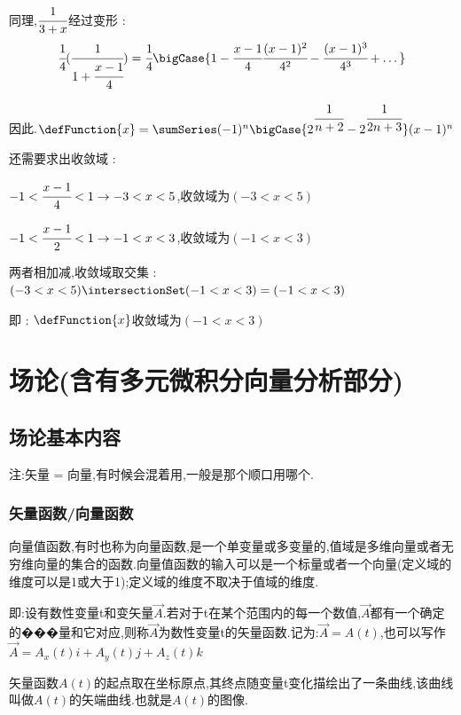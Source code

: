 {{{{{\begin{enumerate}
{          同理,$\cfrac{1}{3 + x}$经过变形 :
          $$
            \cfrac{1}{4}(\cfrac{1}{1 + \cfrac{x - 1}{4}}) = \cfrac{1}{4}\bigCase{1 - \cfrac{x - 1}{4} \cfrac{(x - 1)^2}{4^2} - \cfrac{(x - 1)^3}{4^3} + \dots}
          $$

          因此.$\defFunction{x} = \sumSeries(-1)^n\bigCase{2^{\cfrac{1}{n + 2}} - 2^{\cfrac{1}{2n + 3}}}(x - 1)^n$

          还需要求出收敛域 :

          $-1 < \cfrac{x - 1}{4} < 1 \to -3 < x < 5$,收敛域为$(-3 < x < 5)$

          $-1 < \cfrac{x - 1}{2} < 1 \to -1 < x < 3$,收敛域为$(-1 < x < 3)$

          两者相加减,收敛域取交集 : $(-3 < x < 5) \intersectionSet (-1 < x < 3) = (-1 < x < 3)$

          即 : $\defFunction{x}$收敛域为$(-1 < x < 3)$
          }
  \end{enumerate}
}%

}%

}%

}%

\chapter{场论(含有多元微积分向量分析部分)}{

  \section{场论基本内容}{
    注:矢量 = 向量,有时候会混着用,一般是那个顺口用哪个.

    \subsection{矢量函数/向量函数}{
      向量值函数,有时也称为向量函数,是一个单变量或多变量的,值域是多维向量或者无穷维向量的集合的函数.向量值函数的输入可以是一个标量或者一个向量(定义域的维度可以是1或大于1);定义域的维度不取决于值域的维度.

      即:设有数性变量t和变矢量$\vec{A}$.若对于t在某个范围内的每一个数值,$\vec{A}$都有一个确定的���量和它对应,则称$\vec{A}$为数性变量t的矢量函数.记为:$\vec{A} = A(t)$,也可以写作$\vec{A} = A_x(t)i + A_y(t)j + A_z(t)k$

      矢量函数$A(t)$的起点取在坐标原点,其终点随变量t变化描绘出了一条曲线,该曲线叫做$A(t)$的矢端曲线.也就是$A(t)$的图像.
    }%

}}}
